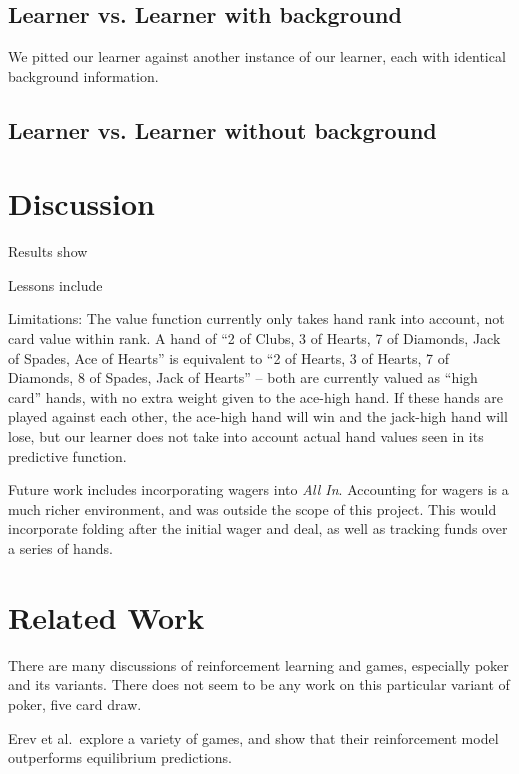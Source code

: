 \documentclass[12pt,pdftex,twocolumn]{article}
\begin{document}
\subsection{Learner vs. Learner with background}
We pitted our learner against another instance of our learner, each with identical background information.

\subsection{Learner vs. Learner without background}

\section{Discussion}
Results show

Lessons include

Limitations:   The value function currently only takes hand rank into account, not card value within rank. A hand of ``2 of Clubs, 3 of Hearts, 7 of Diamonds, Jack of Spades, Ace of Hearts'' is equivalent to ``2 of Hearts, 3 of Hearts, 7 of Diamonds, 8 of Spades, Jack of Hearts'' -- both are currently valued as ``high card'' hands, with no extra weight given to the ace-high hand. 
If these hands are played against each other, the ace-high hand will win and the jack-high hand will lose, but our learner does not take into account actual hand values seen in its predictive function.

Future work includes incorporating wagers into \emph{All In}.  
Accounting for wagers is a much richer environment, and was outside the scope of this project.  This would incorporate folding after the initial wager and deal, as well as tracking funds over a series of hands.

\section{Related Work}
There are many discussions of reinforcement learning and games, especially poker and its variants.
There does not seem to be any work on this particular variant of poker, five card draw.  

Erev et al.\ explore a variety of games, and show that their reinforcement model outperforms equilibrium predictions\cite{Erev98}.  
\end{document}
